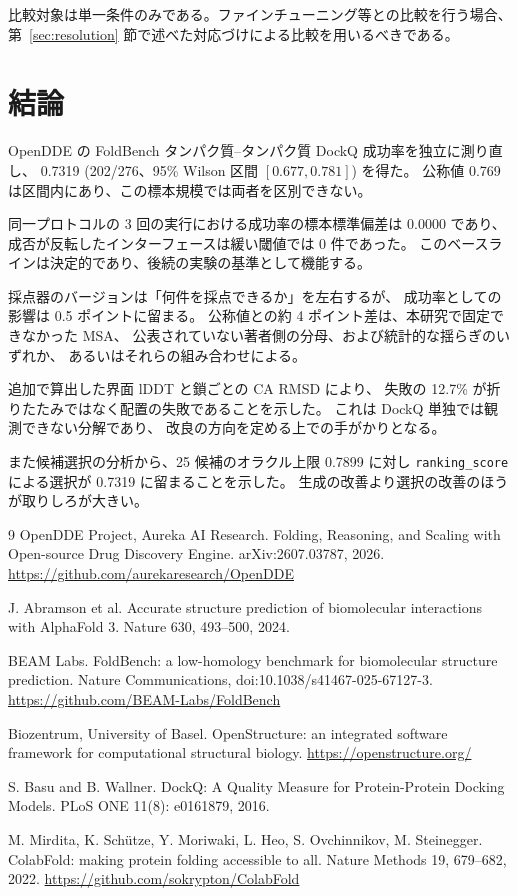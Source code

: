 \documentclass[11pt,a4paper]{article}
\begin{document}
比較対象は単一条件のみである。ファインチューニング等との比較を行う場合、
第~\ref{sec:resolution} 節で述べた対応づけによる比較を用いるべきである。

\section{結論}

OpenDDE の FoldBench タンパク質--タンパク質 DockQ 成功率を独立に測り直し、
0.7319 (202/276、95\% Wilson 区間 $[0.677, 0.781]$) を得た。
公称値 0.769 は区間内にあり、この標本規模では両者を区別できない。

同一プロトコルの 3 回の実行における成功率の標本標準偏差は 0.0000 であり、
成否が反転したインターフェースは緩い閾値では 0 件であった。
このベースラインは決定的であり、後続の実験の基準として機能する。

採点器のバージョンは「何件を採点できるか」を左右するが、
成功率としての影響は 0.5 ポイントに留まる。
公称値との約 4 ポイント差は、本研究で固定できなかった MSA、
公表されていない著者側の分母、および統計的な揺らぎのいずれか、
あるいはそれらの組み合わせによる。

追加で算出した界面 lDDT と鎖ごとの CA RMSD により、
失敗の 12.7\% が折りたたみではなく配置の失敗であることを示した。
これは DockQ 単独では観測できない分解であり、
改良の方向を定める上での手がかりとなる。

また候補選択の分析から、25 候補のオラクル上限 0.7899 に対し
\texttt{ranking\_score} による選択が 0.7319 に留まることを示した。
生成の改善より選択の改善のほうが取りしろが大きい。

\begin{thebibliography}{9}
OpenDDE Project, Aureka AI Research.
\newblock Folding, Reasoning, and Scaling with Open-source Drug Discovery Engine.
\newblock arXiv:2607.03787, 2026.
\newblock \url{https://github.com/aurekaresearch/OpenDDE}

J. Abramson et al.
\newblock Accurate structure prediction of biomolecular interactions with AlphaFold 3.
\newblock Nature 630, 493--500, 2024.

BEAM Labs.
\newblock FoldBench: a low-homology benchmark for biomolecular structure prediction.
\newblock Nature Communications, doi:10.1038/s41467-025-67127-3.
\newblock \url{https://github.com/BEAM-Labs/FoldBench}

Biozentrum, University of Basel.
\newblock OpenStructure: an integrated software framework for computational structural biology.
\newblock \url{https://openstructure.org/}

S. Basu and B. Wallner.
\newblock DockQ: A Quality Measure for Protein-Protein Docking Models.
\newblock PLoS ONE 11(8): e0161879, 2016.

M. Mirdita, K. Sch\"utze, Y. Moriwaki, L. Heo, S. Ovchinnikov, M. Steinegger.
\newblock ColabFold: making protein folding accessible to all.
\newblock Nature Methods 19, 679--682, 2022.
\newblock \url{https://github.com/sokrypton/ColabFold}
\end{thebibliography}
\end{document}
